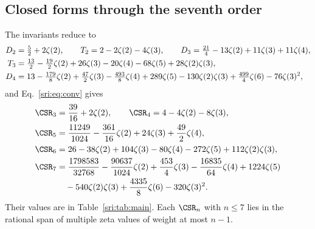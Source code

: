 \subsection{Closed forms through the seventh order}\label{sri:sec:closed}
The invariants reduce to
\begin{align}
 D_2&=\tfrac52+2\zeta(2),\qquad T_2=2-2\zeta(2)-4\zeta(3),\qquad
 D_3=\tfrac{21}{4}-13\zeta(2)+11\zeta(3)+11\zeta(4),\notag\\
 T_3&=\tfrac{13}{2}-\tfrac{19}{2}\zeta(2)+26\zeta(3)-20\zeta(4)-68\zeta(5)+28\zeta(2)\zeta(3),\\
 D_4&=13-\tfrac{179}{8}\zeta(2)+\tfrac{47}{2}\zeta(3)-\tfrac{493}{8}\zeta(4)+289\zeta(5)-130\zeta(2)\zeta(3)
 +\tfrac{499}{4}\zeta(6)-76\zeta(3)^2,\notag
\end{align}
and Eq.~\eqref{sri:eq:conv} gives
\begin{equation}
\begin{aligned}
 \CSR_3&=\frac{39}{16}+2\zeta(2),\qquad \CSR_4=4-4\zeta(2)-8\zeta(3),\\
 \CSR_5&=\frac{11249}{1024}-\frac{361}{16}\zeta(2)+24\zeta(3)+\frac{49}{2}\zeta(4),\\
 \CSR_6&=26-38\zeta(2)+104\zeta(3)-80\zeta(4)-272\zeta(5)+112\zeta(2)\zeta(3),\\
 \CSR_7&=\frac{1798583}{32768}-\frac{90637}{1024}\zeta(2)+\frac{453}{4}\zeta(3)-\frac{16835}{64}\zeta(4)+1224\zeta(5)\\
 &\quad-540\zeta(2)\zeta(3)+\frac{4335}{8}\zeta(6)-320\zeta(3)^2.
\end{aligned}
\label{sri:eq:closed}
\end{equation}
Their values are in Table~\ref{sri:tab:main}. Each $\CSR_n$ with $n\le7$ lies in the rational span of multiple zeta
values of weight at most $n-1$.

